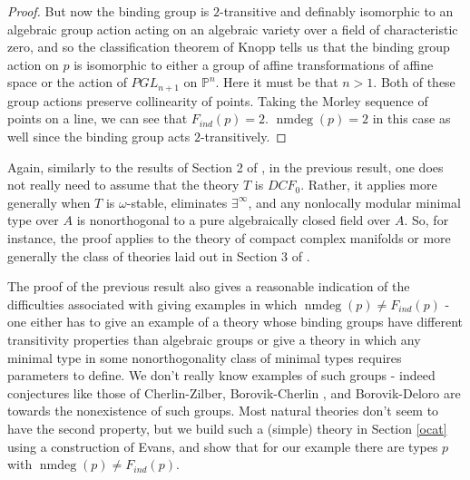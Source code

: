 \documentclass[11pt]{amsart}
\def\nmdeg{\mathop{\rm nmdeg}}
\def\nmdeg{\operatorname{nmdeg}}
\theoremstyle{definition}
\theoremstyle{remark}
\newcommand{\m}{\mathbb }
\numberwithin{equation}{section}
\begin{document}
\begin{proof}
    But now the binding group is $2$-transitive and definably isomorphic to an algebraic group action acting on an algebraic variety over a field of characteristic zero, and so the classification theorem of Knopp \cite{knop1983mehrfach} tells us that the binding group action on $p$ is isomorphic to either a group of affine transformations of affine space or the action of $PGL_{n+1}$ on $\m P^n.$ Here it must be that $n>1.$ Both of these group actions preserve collinearity of points. Taking the Morley sequence of points on a line, we can see that $F_{ind} (p) =2.$ $\nmdeg(p)=2$ in this case as well since the binding group acts $2$-transitively. 
\end{proof}

Again, similarly to the results of Section 2 of \cite{freitag2023degree}, in the previous result, one does not really need to assume that the theory $T$ is $DCF_0$.
Rather, it applies more generally when $T$ is $\omega$-stable, eliminates $\exists ^ \infty$, and any nonlocally modular minimal type over $A$ is nonorthogonal to a pure algebraically closed field over $A$. So, for instance, the proof applies to the theory of compact complex manifolds or more generally the class of theories laid out in Section 3 of \cite{freitag2023degree}.

The proof of the previous result also gives a reasonable indication of the difficulties associated with giving 
examples in which $\nmdeg(p) \neq F_{ind}(p)$ - one either has to give an example of a theory whose binding groups have different transitivity properties than algebraic groups or give a theory in which any minimal type in some nonorthogonality class of minimal types requires parameters to define. We don't really know examples of such groups - indeed conjectures like those of Cherlin-Zilber, Borovik-Cherlin \cite{bcorig}, and Borovik-Deloro \cite{borovik2019binding} are towards the nonexistence of such groups. Most natural theories don't seem to have the second property, but we build such a (simple) theory in Section \ref{ocat} using a construction of Evans, and show that for our example there are types $p$ with $\nmdeg(p) \neq F_{ind}(p)$.
\end{document}
